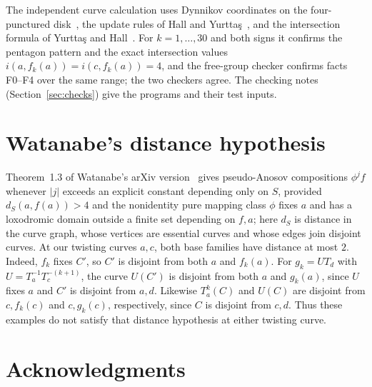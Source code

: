 \documentclass[11pt]{article}
\theoremstyle{remark}
\begin{document}
\begin{appendices}
The independent curve calculation uses Dynnikov coordinates on the
four-punctured disk~\cite{Dynnikov}, the update rules of Hall and
Yurttaş~\cite{HY}, and the intersection formula of Yurttaş and
Hall~\cite[Lemma~9]{YH}. For $k=1,\dots,30$ and both signs it confirms
the pentagon pattern and the exact intersection values
$i(a,f_k(a))=i(c,f_k(a))=4$, and the free-group checker confirms facts
F0--F4 over the same range; the two checkers agree. The
checking notes (Section~\ref{sec:checks}) give the programs and their
test inputs.

\section{Watanabe's distance hypothesis}\label{app:watanabe}

Theorem~1.3 of Watanabe's arXiv version~\cite{Watanabe} gives
pseudo-Anosov compositions $\phi^jf$ whenever $|j|$ exceeds an explicit
constant depending only on $S$, provided $d_S(a,f(a))>4$ and the
nonidentity pure mapping class $\phi$ fixes $a$ and has a loxodromic
domain outside a finite set depending on $f,a$; here $d_S$ is distance in
the curve graph, whose vertices are essential curves and whose edges join
disjoint curves. At our twisting curves $a,c$, both base families have
distance at most $2$. Indeed, $f_k$ fixes $C'$, so $C'$ is disjoint from
both $a$ and $f_k(a)$. For $g_k=UT_d$ with $U=T_a^{-1}T_c^{-(k+1)}$, the
curve $U(C')$ is disjoint from both $a$ and $g_k(a)$, since $U$ fixes $a$
and $C'$ is disjoint from $a,d$. Likewise $T_a^k(C)$ and $U(C)$ are
disjoint from $c,f_k(c)$ and $c,g_k(c)$, respectively, since $C$ is
disjoint from $c,d$. Thus these examples do not satisfy that distance
hypothesis at either twisting curve.

\end{appendices}

\section*{Acknowledgments}
\end{document}
